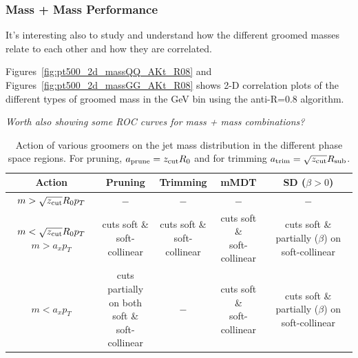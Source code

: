 \subsubsection*{Mass + Mass Performance}

It's interesting also to study and understand how the different
groomed masses relate to each other and how they are correlated.

Figures~\ref{fig:pt500_2d_massQQ_AKt_R08} and Figures~\ref{fig:pt500_2d_massGG_AKt_R08} shows 2-D correlation plots of
the different types of groomed mass in the  GeV bin using the anti-\kT R=0.8
algorithm.

{\it Worth also showing some ROC curves for mass + mass combinations?}


\begin{table}[htbp!]
\centering
\caption{Action of various groomers on the jet mass distribution in the different phase space regions.  For pruning, $a_\text{prune} = z_\text{cut} R_0$ and for trimming $a_\text{trim} = \sqrt{z_\text{cut}} R_\text{sub}$.}
\begin{tabular}{c|c|c|c|c} 
Action & Pruning & Trimming & mMDT & SD ($\beta > 0$) \\ \hline
$m>\sqrt{z_\text{cut}}R_0 p_T$  &  $-$ & $-$ &  $-$  & $-$ \\ \hline
\parbox[c][3em][c]{7em}{$m<\sqrt{z_\text{cut}}R_0 p_T$\\$m>a_x p_T$} & \parbox[c][3em][c]{6em}{cuts soft \& \\ soft-collinear}  & \parbox[c][3em][c]{6em}{cuts soft \& \\ soft-collinear} & \parbox[c][3em][c]{6em}{cuts soft \& \\ soft-collinear} & \parbox[c][5em][c]{7em}{cuts soft \& \\ partially ($\beta$) \\ on soft-collinear}  \\ \hline
$m<a_x p_T$ & \parbox[c][5em][c]{7em}{cuts partially \\ on both soft \& \\  soft-collinear}   &$-$ & \parbox[c][3em][c]{6em}{cuts soft \& \\ soft-collinear} & \parbox[c][5em][c]{7em}{cuts soft \& \\ partially ($\beta$) \\ on soft-collinear} 
\end{tabular}
\label{tab:boostedtoprates}
\end{table}


